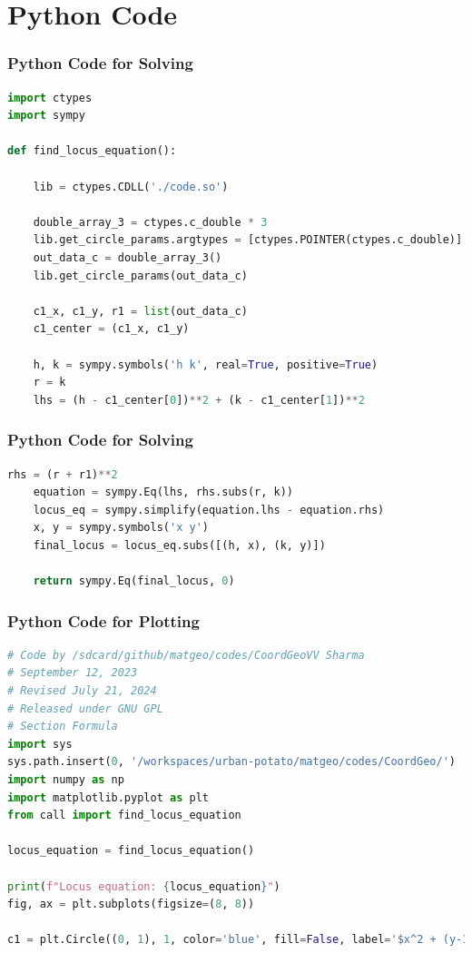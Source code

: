 \documentclass{beamer}
\theoremstyle{remark}
\numberwithin{equation}{section}
\begin{document}
\section{Python Code}
\begin{frame}[fragile]
\frametitle{Python Code for Solving}
\begin{lstlisting}[language=Python]
import ctypes
import sympy

def find_locus_equation():
     
    lib = ctypes.CDLL('./code.so')
   
    double_array_3 = ctypes.c_double * 3
    lib.get_circle_params.argtypes = [ctypes.POINTER(ctypes.c_double)]
    out_data_c = double_array_3()
    lib.get_circle_params(out_data_c)
     
    c1_x, c1_y, r1 = list(out_data_c)
    c1_center = (c1_x, c1_y)
 
    h, k = sympy.symbols('h k', real=True, positive=True)
    r = k
    lhs = (h - c1_center[0])**2 + (k - c1_center[1])**2

\end{lstlisting}
\end{frame}
\begin{frame}[fragile]
\frametitle{Python Code for Solving}
\begin{lstlisting}[language=Python]
   rhs = (r + r1)**2
    equation = sympy.Eq(lhs, rhs.subs(r, k))
    locus_eq = sympy.simplify(equation.lhs - equation.rhs)
    x, y = sympy.symbols('x y')
    final_locus = locus_eq.subs([(h, x), (k, y)])
    
    return sympy.Eq(final_locus, 0)
\end{lstlisting}
\end{frame}
\begin{frame}[fragile]
\frametitle{Python Code for Plotting}
\begin{lstlisting}[language=Python]
# Code by /sdcard/github/matgeo/codes/CoordGeoVV Sharma
# September 12, 2023
# Revised July 21, 2024
# Released under GNU GPL
# Section Formula
import sys
sys.path.insert(0, '/workspaces/urban-potato/matgeo/codes/CoordGeo/') 
import numpy as np
import matplotlib.pyplot as plt
from call import find_locus_equation  

locus_equation = find_locus_equation()
 
print(f"Locus equation: {locus_equation}")
fig, ax = plt.subplots(figsize=(8, 8))
  
c1 = plt.Circle((0, 1), 1, color='blue', fill=False, label='$x^2 + (y-1)^2 = 1$')

\end{lstlisting}
\end{frame}
\end{document}
